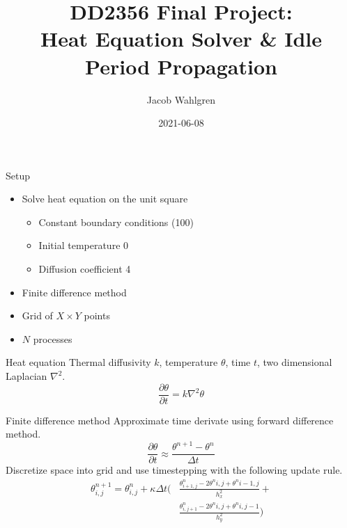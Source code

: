 \documentclass{beamer}
\title{DD2356 Final Project: \\
    Heat Equation Solver \& Idle Period Propagation
}
\author{Jacob Wahlgren}
\institute{KTH}
\date{2021-06-08}
\begin{document}
\frame{\titlepage}

\begin{frame}{Setup}
    \begin{itemize}
        \item Solve heat equation on the unit square
            \begin{itemize}
            \item Constant boundary conditions (100)
            \item Initial temperature 0
            \item Diffusion coefficient 4
        \end{itemize}
        \item Finite difference method
        \item Grid of $X \times Y$ points
        \item $N$ processes
    \end{itemize}
\end{frame}

\begin{frame}{Heat equation}
    Thermal diffusivity $k$, temperature $\theta$, time $t$, two dimensional
    Laplacian $\nabla^2$.
    \[\frac{\partial \theta}{\partial t} = k \nabla^2 \theta\]
\end{frame}

\begin{frame}{Finite difference method}
    Approximate time derivate using forward difference method.
    \[\frac{\partial \theta}{\partial t} \approx
    \frac{\theta^{n+1}-\theta^n}{\Delta t}\]
    Discretize space into grid and use timestepping with the following
    update rule.
    \begin{align*}
        \theta_{i,j}^{n+1} = \theta^n_{i,j} + \kappa \Delta
        t\Bigg(&\frac{\theta^n_{i+1,j} - 2\theta^n{i,j}+\theta^n{i-1,j}}{h_x^2} +\\
          &\frac{\theta^n_{i,j+1} - 2\theta^n{i,j}+\theta^n{i,j-1}}{h_y^2}\Bigg)
    \end{align*}
\end{frame}
\end{document}
